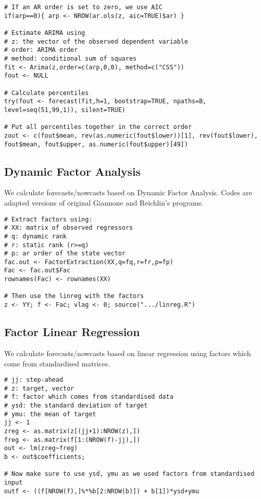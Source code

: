 \documentclass[12pt]{article}
\begin{document}
\begin{lstlisting}[title=\textbf{ARIMA forecasting.}]
# If an AR order is set to zero, we use AIC
if(arp==0){ arp <- NROW(ar.ols(z, aic=TRUE)$ar) }

# Estimate ARIMA using
# z: the vector of the observed dependent variable
# order: ARIMA order
# method: conditional sum of squares
fit <- Arima(z,order=c(arp,0,0), method=c("CSS"))
fout <- NULL

# Calculate percentiles
try(fout <- forecast(fit,h=1, bootstrap=TRUE, npaths=B, level=seq(51,99,1)), silent=TRUE)

# Put all percentiles together in the correct order
zout <- c(fout$mean, rev(as.numeric(fout$lower))[1], rev(fout$lower), fout$mean, fout$upper, as.numeric(fout$upper)[49])
\end{lstlisting}

\subsection{Dynamic Factor Analysis \textendash{} {\href{https://github.com/eurostat/econowcast/blob/master/nowcast/dfa.R}{}}}

We calculate forecasts/nowcasts based on Dynamic Factor Analysis. 
Codes are adapted versions of original Giannone and Reichlin's  programs.

\begin{lstlisting}[title=\textbf{Dynamic Factor Analysis forecasting.}]
# Extract factors using:
# XX: matrix of observed regressors
# q: dynamic rank
# r: static rank (r>=q)
# p: ar order of the state vector
fac.out <- FactorExtraction(XX,q=fq,r=fr,p=fp)
Fac <- fac.out$Fac
rownames(Fac) <- rownames(XX)

# Then use the linreg with the factors
z <- YY; f <- Fac; vlag <- 0; source(".../linreg.R")
\end{lstlisting}

\subsection{Factor Linear Regression \textendash{} {\href{https://github.com/eurostat/econowcast/blob/master/nowcast/Flinreg.R}{}}}

We calculate forecasts/nowcasts based on linear regression using factors which
come from standardised matrices.

\begin{lstlisting}[title=\textbf{Factor Linear regression.}]
# jj: step-ahead
# z: target, vector
# f: factor which comes from standardised data
# ysd: the standard deviation of target
# ymu: the mean of target
jj <- 1
zreg <- as.matrix(z[(jj+1):NROW(z),])
freg <- as.matrix(f[1:(NROW(f)-jj),])
out <- lm(zreg~freg)
b <- out$coefficients;

# Now make sure to use ysd, ymu as we used factors from standardised input
outf <- ((f[NROW(f),]%*%b[2:NROW(b)]) + b[1])*ysd+ymu
\end{lstlisting}
\end{document}
